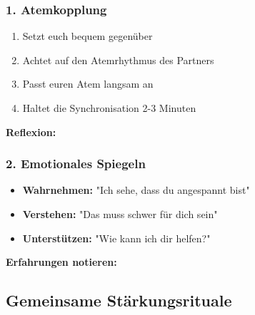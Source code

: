\begin{ctmmGreenBox}[title=Praktische Übungen]

\subsubsection{1. Atemkopplung}
\begin{enumerate}
  \item Setzt euch bequem gegenüber
  \item Achtet auf den Atemrhythmus des Partners
  \item Passt euren Atem langsam an
  \item Haltet die Synchronisation 2-3 Minuten
\end{enumerate}

\textbf{Reflexion:} \\

\subsubsection{2. Emotionales Spiegeln}
\begin{itemize}
  \item \textbf{Wahrnehmen:} "Ich sehe, dass du angespannt bist"
  \item \textbf{Verstehen:} "Das muss schwer für dich sein"
  \item \textbf{Unterstützen:} "Wie kann ich dir helfen?"
\end{itemize}

\textbf{Erfahrungen notieren:} \\

\end{ctmmGreenBox}

\subsection{Gemeinsame Stärkungsrituale}

